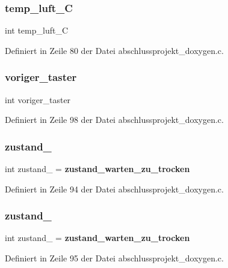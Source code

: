 \subsubsection{temp\+\_\+luft\+\_\+C}
{\footnotesize\ttfamily int temp\+\_\+luft\+\_\+C}



Definiert in Zeile 80 der Datei abschlussprojekt\+\_\+doxygen.\+c.

\mbox{\label{abschlussprojekt__doxygen_8c_aa8909f35a0f963844648169d995f3d0a}} 
\subsubsection{voriger\+\_\+taster}
{\footnotesize\ttfamily int voriger\+\_\+taster}



Definiert in Zeile 98 der Datei abschlussprojekt\+\_\+doxygen.\+c.

\mbox{\label{abschlussprojekt__doxygen_8c_a312a74000d8f9d74536e66d0a5e7bfc4}} 
\subsubsection{zustand\+\_}
{\footnotesize\ttfamily int zustand\+\_ = \textbf{ zustand\+\_\+warten\+\_\+zu\+\_\+trocken}}



Definiert in Zeile 94 der Datei abschlussprojekt\+\_\+doxygen.\+c.

\mbox{\label{abschlussprojekt__doxygen_8c_ae5d230a4da9cb370063e945d94d7043a}} 
\subsubsection{zustand\+\_}
{\footnotesize\ttfamily int zustand\+\_ = \textbf{ zustand\+\_\+warten\+\_\+zu\+\_\+trocken}}



Definiert in Zeile 95 der Datei abschlussprojekt\+\_\+doxygen.\+c.

